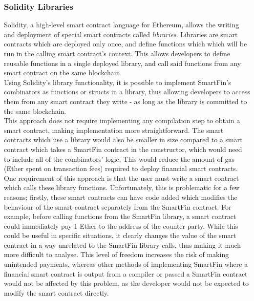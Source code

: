 \subsubsection{Solidity Libraries}

Solidity, a high-level smart contract language for Ethereum, allows the writing and deployment of special smart contracts called \textit{libraries}. Libraries are smart contracts which are deployed only once, and define functions which which will be run in the calling smart contract's context\cite{EthLib}. This allows developers to define reusable functions in a single deployed library, and call said functions from any smart contract on the same blockchain. \\

Using Solidity's library functionality, it is possible to implement SmartFin's combinators as functions or structs in a library, thus allowing developers to access them from any smart contract they write - as long as the library is committed to the same blockchain. \\

This approach does not require implementing any compilation step to obtain a smart contract, making implementation more straightforward. The smart contracts which use a library would also be smaller in size compared to a smart contract which takes a SmartFin contract in the constructor, which would need to include all of the combinators' logic. This would reduce the amount of gas (Ether spent on transaction fees) required to deploy financial smart contracts. \\

One requirement of this approach is that the user must write a smart contract which calls these library functions. Unfortunately, this is problematic for a few reasons; firstly, these smart contracts can have code added which modifies the behaviour of the smart contract separately from the SmartFin contract. For example, before calling functions from the SmartFin library, a smart contract could immediately pay 1 Ether to the address of the counter-party. While this could be useful in specific situations, it clearly changes the value of the smart contract in a way unrelated to the SmartFin library calls, thus making it much more difficult to analyse. This level of freedom increases the risk of making unintended payments, whereas other methods of implementing SmartFin where a financial smart contract is output from a compiler or passed a SmartFin contract would not be affected by this problem, as the developer would not be expected to modify the smart contract directly. \\


